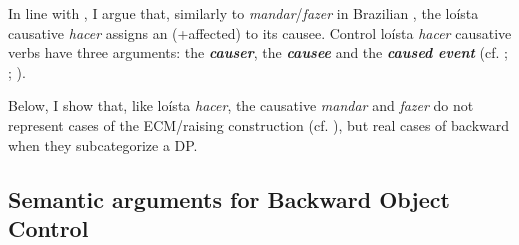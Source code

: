 \documentclass[output=paper]{langsci/langscibook}
\begin{document}
In line with \citet{López2001}, I argue that, similarly to \textit{mandar}/\textit{fazer} in Brazilian , the loísta causative \textit{hacer} assigns an (+affected)  to its causee. Control loísta \textit{hacer} causative verbs have three arguments: the \textbf{\textit{causer}}, the \textbf{\textit{causee} }and the \textbf{\textit{caused event}} (cf. \citealt{Zubizarreta1985}; \citealt{Alsina1992}; \citealt{Ippolito2000}). 

Below, I show that, like loísta \textit{hacer}, the causative \textit{mandar} and \textit{fazer} do not represent cases of the ECM\slash raising construction (cf. \citealt{Farrell1995}), but real cases of backward  when they subcategorize a DP.

\subsection{Semantic arguments for Backward Object Control} %
\end{document}
